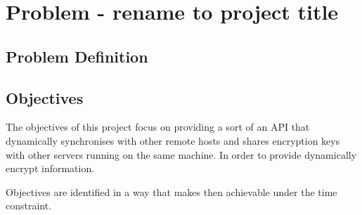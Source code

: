 \chapter{Problem - rename to project title}
\label{chap:problem}


\section{Problem Definition}



\section{Objectives}
The objectives of this project focus on providing a sort of an API that dynamically synchronises with other remote hosts and shares encryption keys with other servers running on the same machine. In order to provide dynamically encrypt information.

Objectives are identified in a way that makes then achievable under the time constraint.

